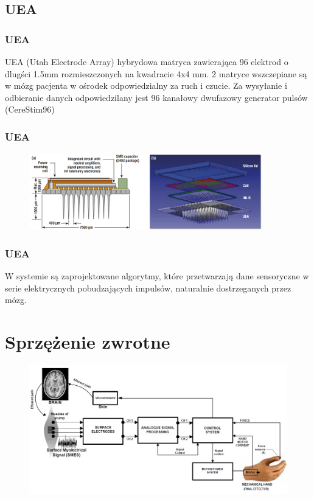 \documentclass[8pt]{beamer}
\begin{document}
\subsection{UEA}
\begin{frame}
\frametitle{UEA}
UEA (Utah Electrode Array) hybrydowa matryca zawierająca 96 elektrod o dlugści 1.5mm rozmieszczonych na kwadracie 4x4 mm.
2 matryce wszczepiane są w mózg pacjenta w ośrodek odpowiedzialny za ruch i czucie. Za wysyłanie i odbieranie danych odpowiedzilany jest
96 kanałowy dwufazowy generator pulsów (CereStim96)
\end{frame}	
\begin{frame}
\frametitle{UEA}
\begin{figure}[htbp]
  \begin{center}
    \includegraphics[width=0.9\textwidth]{graphics/UEA2.png}
  \end{center}
 \end{figure} 
\end{frame}
\begin{frame}
\frametitle{UEA}
W systemie są zaprojektowane algorytmy, które przetwarzają dane sensoryczne w serie elektrycznych pobudzających impulsów, naturalnie dostrzeganych przez mózg.
\end{frame}
\section{Sprzężenie zwrotne}

\begin{frame}%
	\begin{center}
		\begin{figure}
			\includegraphics[width=\textwidth]{graphics/feedback.jpg}
			\label{graph:feedback}	
		\end{figure}
	\end{center}
\end{frame}
\end{document}
